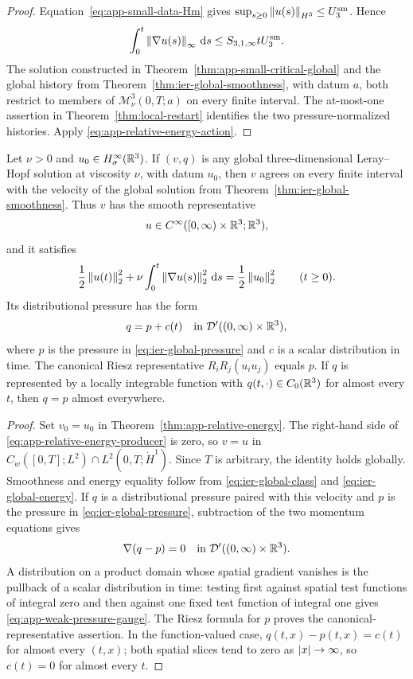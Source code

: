 \begin{proof}
Equation~\eqref{eq:app-small-data-Hm} gives
\(\sup_{s\ge0}\left\lVert u(s)\right\rVert_{H^3}\le U_3^{\rm sm}\).  Hence
\[
 \int_0^t\left\lVert \nabla u(s)\right\rVert_\infty\,\mathrm d s
 \le S_{3,1,\infty}tU_3^{\rm sm}.
\]
The solution constructed in Theorem~\ref{thm:app-small-critical-global} and
the global history from Theorem~\ref{thm:ier-global-smoothness}, with datum
\(a\), both restrict to members of
\(\mathscr M_\nu^3(0,T;a)\) on every finite interval.  The at-most-one
assertion in Theorem~\ref{thm:local-restart} identifies the two
pressure-normalized histories.
Apply \eqref{eq:app-relative-energy-action}.
\end{proof}

\begin{corollary}
\label{cor:app-leray-uniqueness}
Let \(\nu>0\) and \(u_0\in H^\infty_\sigma(\mathbb R^3)\).  If \((v,q)\) is any global
three-dimensional Leray--Hopf solution at viscosity \(\nu\), with datum
\(u_0\), then \(v\) agrees on every finite interval with the velocity of the
global solution from Theorem~\ref{thm:ier-global-smoothness}.  Thus \(v\) has
the smooth
representative
\[
 u\in C^\infty([0,\infty)\times\mathbb R^3;\mathbb R^3),
\]
and it satisfies
\[
 \frac12\left\lVert u(t)\right\rVert_2^2
 +\nu\int_0^t\left\lVert \nabla u(s)\right\rVert_2^2\,\mathrm d s
 =\frac12\left\lVert u_0\right\rVert_2^2
 \qquad(t\ge0).
\]
Its distributional pressure has the form
\begin{equation}
 q=p+c(t)
 \quad\text{in }\mathcal D'((0,\infty)\times\mathbb R^3),
 \label{eq:app-weak-pressure-gauge}
\end{equation}
where \(p\) is the pressure in \eqref{eq:ier-global-pressure} and \(c\) is a
scalar distribution in time.  The canonical Riesz representative
\(R_iR_j(u_i u_j)\) equals \(p\).  If \(q\) is represented by a locally
integrable function with \(q(t,\cdot)\in C_0(\mathbb R^3)\) for almost every \(t\),
then \(q=p\) almost everywhere.
\end{corollary}

\begin{proof}
Set \(v_0=u_0\) in Theorem~\ref{thm:app-relative-energy}.  The right-hand
side of \eqref{eq:app-relative-energy-producer} is zero, so
\(v=u\) in \(C_w([0,T];L^2)\cap L^2(0,T;\dot H^1)\).  Since \(T\) is
 arbitrary, the identity holds globally.  Smoothness and energy equality
 follow from \eqref{eq:ier-global-class} and
 \eqref{eq:ier-global-energy}.  If \(q\) is a distributional pressure paired
 with this velocity and \(p\) is the pressure in
 \eqref{eq:ier-global-pressure}, subtraction of the two momentum equations
 gives
 \[
  \nabla(q-p)=0
  \quad\text{in }\mathcal D'((0,\infty)\times\mathbb R^3).
 \]
 A distribution on a product domain whose spatial gradient vanishes is the
 pullback of a scalar distribution in time: testing first against spatial test
 functions of integral zero and then against one fixed test function of
 integral one gives \eqref{eq:app-weak-pressure-gauge}.  The Riesz formula for
 \(p\) proves the canonical-representative assertion.  In the function-valued
 case, \(q(t,x)-p(t,x)=c(t)\) for almost every \((t,x)\); both spatial slices
 tend to zero as \(\left|x\right|\to\infty\), so \(c(t)=0\) for almost every \(t\).
\end{proof}
